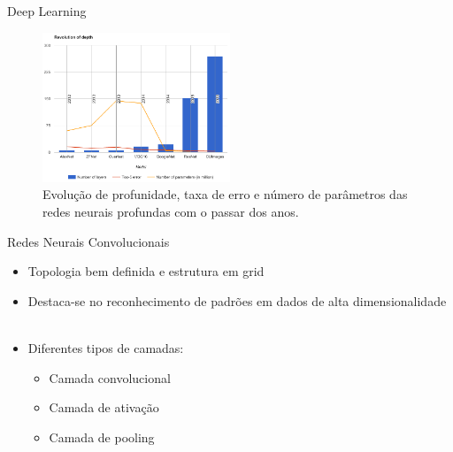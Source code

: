 \begin{frame}{Deep Learning}
   \ \  \\[0.1cm]
   \begin{figure}[ht]
   	\centering
   	\label{fig:compara_redes}
   	\includegraphics[width=0.5\textwidth]{img/compara_redes.png}
     \caption{\footnotesize{Evolução de profunidade, taxa de erro e número de parâmetros das redes neurais profundas com o passar dos anos.}}
   \end{figure}
\end{frame}

\begin{frame}{Redes Neurais Convolucionais}
   \ \  \\[0.1cm]
   \begin{itemize}
     \item Topologia bem definida e estrutura em grid
    \item Destaca-se no reconhecimento de padrões em dados de alta dimensionalidade
     \ \ \newline
     \item Diferentes tipos de camadas:
     \begin{itemize}
       \item Camada convolucional
       \item Camada de ativação
       \item Camada de pooling
     \end{itemize}

   \end{itemize}
\end{frame}

